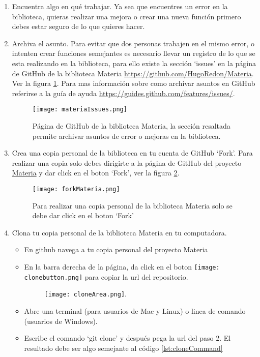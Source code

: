 	\begin{enumerate}\itemsep0ex
		\item Encuentra algo en qué trabajar. Ya sea que encuentres un error en la biblioteca, quieras realizar una mejora o crear una nueva función primero debes estar seguro de lo que quieres hacer. 

		\item Archiva el asunto. Para evitar que dos personas trabajen en el mismo error, o intenten crear funciones semejantes es necesario llevar un registro de lo que se esta realizando en la biblioteca, para ello existe la sección `issues' en la página de GitHub de la biblioteca Materia \url{https://github.com/HugoRedon/Materia}. Ver la figura \ref{fig:issuesMateria}. Para mas información sobre como archivar asuntos en GitHub referirse a la guía de ayuda \url{https://guides.github.com/features/issues/}.

		\begin{figure}[!h]
			\texttt{[image: materiaIssues.png]}
			\caption{Página de GitHub de la biblioteca Materia, la sección resaltada permite archivar asuntos de error o mejoras en la biblioteca.}
			\label{fig:issuesMateria}
		\end{figure}

		\item Crea una copia personal de la biblioteca en tu cuenta de GitHub `Fork'. Para realizar una copia solo debes dirigirte a la página de GitHub del proyecto \href{https://github.com/HugoRedon/Materia}{Materia} y dar click en el boton `Fork', ver la figura \ref{fig:forkMateria}.

		\begin{figure}[!h]
			\texttt{[image: forkMateria.png]}
			\caption{Para realizar una copia personal de la biblioteca Materia solo se debe dar click en el boton `Fork'}
			\label{fig:forkMateria}
		\end{figure}

		\item Clona tu copia personal de la biblioteca Materia en tu computadora. 
			\begin{itemize}\itemsep0ex
				\item En github navega a tu copia personal del proyecto Materia
				\item En la barra derecha de la página, da click en el boton \texttt{[image: clonebutton.png]} para copiar la url del repositorio.
				\begin{figure}[!h]
					\centering
					\texttt{[image: cloneArea.png]}.
				\end{figure}
				\item Abre una terminal (para usuarios de Mac y Linux) o linea de comando (usuarios de Windows).
				\item Escribe el comando  `git clone' y después pega la url del paso 2. El resultado debe ser algo semejante al código \ref{lst:cloneCommand}


\end{itemize}
\end{enumerate}
